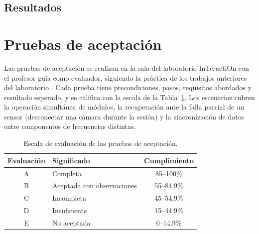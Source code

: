 \subsection{Resultados}


\section{Pruebas de aceptación}

Las pruebas de aceptación se realizan en la sala del laboratorio InTeractiOn con el profesor guía como evaluador, siguiendo la práctica de los trabajos anteriores del laboratorio \citep{estay2020modulo,pezoa2020implementacion,figueroa2025arquitectura}. Cada prueba tiene precondiciones, pasos, requisitos abordados y resultado esperado, y se califica con la escala de la Tabla~\ref{tab:escala}. Los escenarios cubren la operación simultánea de módulos, la recuperación ante la falla parcial de un sensor (desconectar una cámara durante la sesión) y la sincronización de datos entre componentes de frecuencias distintas.

\begin{table}[H]
\centering
\caption{Escala de evaluación de las pruebas de aceptación.}
\label{tab:escala}
\small
\begin{tabular}{clc}
\toprule
\textbf{Evaluación} & \textbf{Significado} & \textbf{Cumplimiento} \\ \midrule
A & Completa & 85--100\% \\
B & Aceptada con observaciones & 55--84,9\% \\
C & Incompleta & 45--54,9\% \\
D & Insuficiente & 15--44,9\% \\
E & No aceptada & 0--14,9\% \\ \bottomrule
\end{tabular}
\end{table}

